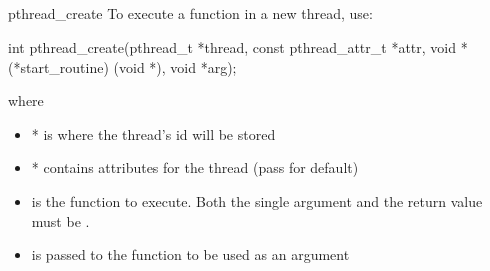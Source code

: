 \documentclass[10pt,graphics,aspectratio=169,table]{beamer}
\begin{document}
\subsection{}
\begin{frame}[fragile]{pthread\_create}
    To execute a function in a new thread, use:
    \begin{codeblock}
int pthread_create(pthread_t *thread,
                   const pthread_attr_t *attr,
                   void *(*start_routine) (void *),
                   void *arg);
\end{codeblock}

    where
    \begin{itemize}
            \item * is where the thread's id will be stored
            \item * contains attributes for the thread (pass  for default)
            \item {} is the function to execute. Both the single argument and the return value must be .
            \item {} is passed to the function to be used as an argument
    \end{itemize}
\end{frame}
\end{document}
